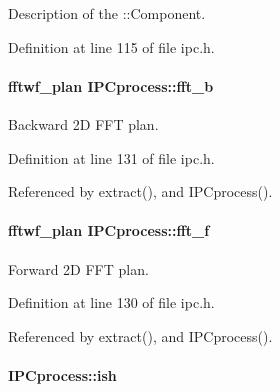 Description of the ::Component. 



Definition at line 115 of file ipc.h.

\hypertarget{classIPCprocess_a4eb21e0faa8cc40e6db4bce50752dec4}{
\paragraph[{fft\_\-b}]{\setlength{\rightskip}{0pt plus 5cm}fftwf\_\-plan {\bf IPCprocess::fft\_\-b}}\hfill}
\label{classIPCprocess_a4eb21e0faa8cc40e6db4bce50752dec4}


Backward 2D FFT plan. 



Definition at line 131 of file ipc.h.



Referenced by extract(), and IPCprocess().

\hypertarget{classIPCprocess_a1114cd499fb7ca67753ed2427e829320}{
\paragraph[{fft\_\-f}]{\setlength{\rightskip}{0pt plus 5cm}fftwf\_\-plan {\bf IPCprocess::fft\_\-f}}\hfill}
\label{classIPCprocess_a1114cd499fb7ca67753ed2427e829320}


Forward 2D FFT plan. 



Definition at line 130 of file ipc.h.



Referenced by extract(), and IPCprocess().

\hypertarget{classIPCprocess_a87d6e0b5e4741d780734724f709c347c}{
\paragraph[{ish}]{ {\bf IPCprocess::ish}}\hfill}
\label{classIPCprocess_a87d6e0b5e4741d780734724f709c347c}


